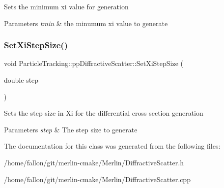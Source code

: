 Sets the minimum xi value for generation 
\begin{DoxyParams}{Parameters}
{\em tmin} & the minumum xi value to generate \\
\hline
\end{DoxyParams}
\mbox{\label{classParticleTracking_1_1ppDiffractiveScatter_af1e7bef526bd62823d1cdc5e9346ac1f}} 
\subsubsection{\texorpdfstring{Set\+Xi\+Step\+Size()}{SetXiStepSize()}}
{\footnotesize\ttfamily void Particle\+Tracking\+::pp\+Diffractive\+Scatter\+::\+Set\+Xi\+Step\+Size (\begin{DoxyParamCaption}\item[{double}]{step }\end{DoxyParamCaption})}

Sets the step size in Xi for the differential cross section generation 
\begin{DoxyParams}{Parameters}
{\em step} & The step size to generate \\
\hline
\end{DoxyParams}


The documentation for this class was generated from the following files\+:\begin{DoxyCompactItemize}
\item 
/home/fallon/git/merlin-\/cmake/\+Merlin/Diffractive\+Scatter.\+h\item 
/home/fallon/git/merlin-\/cmake/\+Merlin/Diffractive\+Scatter.\+cpp\end{DoxyCompactItemize}
